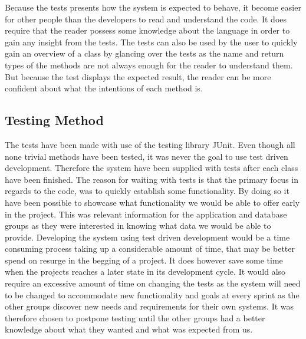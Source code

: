 Because the tests presents how the system is expected to behave, it become easier for other people than the developers to read and understand the code.
It does require that the reader possess some knowledge about the language in order to gain any insight from the tests.
The tests can also be used by the user to quickly gain an overview of a class by glancing over the tests as the name and return types of the methods are not always enough for the reader to understand them.
But because the test displays the expected result, the reader can be more confident about what the intentions of each method is.

\subsection{Testing Method}
The tests have been made with use of the testing library JUnit\cite{junit4}.
Even though all none trivial methods have been tested, it was never the goal to use test driven development.
Therefore the system have been supplied with tests after each class have been finished. 
The reason for waiting with tests is that the primary focus in regards to the code, was to quickly establish some functionality. 
By doing so it have been possible to showcase what functionality we would be able to offer early in the project.%
This was relevant information for the application and database groups as they were interested in knowing what data we would be able to provide.
Developing the system using test driven development would be a time consuming process taking up a considerable amount of time, that may be better spend on resurge in the begging of a project.
It does however save some time when the projects reaches a later state in its development cycle.
It would also require an excessive amount of time on changing the tests as the system will need to be changed to accommodate new functionality and goals at every sprint as the other groups discover new needs and requirements for their own systems.
It was therefore chosen to postpone testing until the other groups had a better knowledge about what they wanted and what was expected from us.
